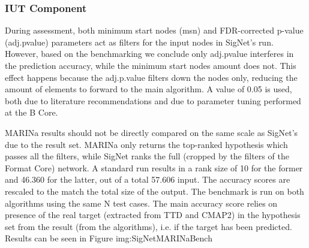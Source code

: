 \subsubsection{IUT Component}
During assessment, both minimum start nodes (msn) and FDR-corrected p-value (adj.pvalue) parameters act as filters for the input nodes in SigNet’s run. However, based on the benchmarking we conclude only adj.pvalue interferes in the prediction accuracy, while the minimum start nodes amount does not. This effect happens because the adj.p.value filters down the nodes only, reducing the amount of elements to forward to the main algorithm. A value of 0.05 is used, both due to literature recommendations and due to parameter tuning performed at the B Core.
\\

\begin{table}[]
\centering
{}
\end{table}

MARINa results should not be directly compared on the same scale as SigNet’s due to the result set. MARINa only returns the top-ranked hypothesis which passes all the filters, while SigNet ranks the full (cropped by the filters of the Format Core) network. A standard run results in a rank size of 10 for the former and 46.360 for the latter, out of a total 57.606 input. The accuracy scores are rescaled to the match the total size of the output.
The benchmark is run on both algorithms using the same N test cases. The main accuracy score relies on presence of the real target (extracted from TTD and CMAP2) in the hypothesis set from the result (from the algorithms), i.e. if the target has been predicted. Results can be seen in Figure img:SigNetMARINaBench
\\

